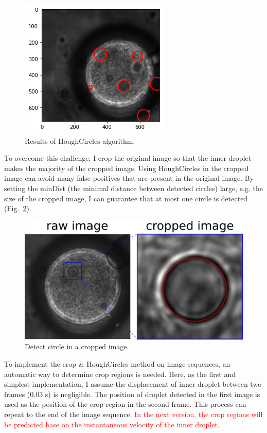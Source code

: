 \documentclass[onecolumn,aps, pre,amsmath,amssymb,longbibliography,11pt]{revtex4-2}
\begin{document}
\begin{figure}[h]
  \includegraphics{HoughCircles_false.png}
  \caption{Results of HoughCircles algorithm.}
  \label{fig:HoughCircles_false}
\end{figure}

To overcome this challenge, I crop the original image so that the inner droplet makes the majority of the cropped image.
Using HoughCircles in the cropped image can avoid many false positives that are present in the original image.
By setting the minDist (the minimal distance between detected circles) large, e.g. the size of the cropped image, I can guarantee that at most one circle is detected (Fig.~\ref{fig:crop}).

\begin{figure}
  \includegraphics{crop.png}
  \caption{Detect circle in a cropped image.}
  \label{fig:crop}
\end{figure}

To implement the crop \& HoughCircles method on image sequences, an automatic way to determine crop regions is needed.
Here, as the first and simplest implementation, I assume the displacement of inner droplet between two frames (0.03 s) is negligible.
The position of droplet detected in the first image is used as the position of the crop region in the second frame.
This process can repeat to the end of the image sequence.
\textcolor{red}{In the next version, the crop regions will be predicted base on the instantaneous velocity of the inner droplet.}
\end{document}
